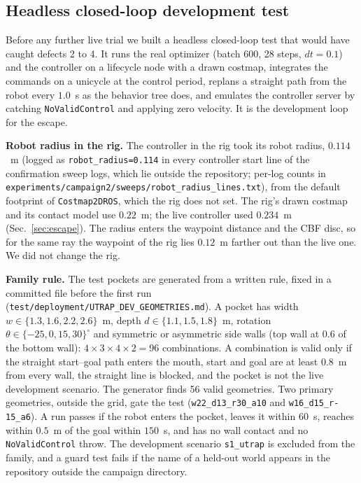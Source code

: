 \documentclass[journal]{IEEEtran}
\begin{document}
\subsection{Headless closed-loop development test}
\label{sec:devtest}

Before any further live trial we built a headless closed-loop test that would have
caught defects 2 to 4. It runs the real optimizer (batch 600, 28 steps, $dt=0.1$) and
the controller on a lifecycle node with a drawn costmap, integrates the commands on a
unicycle at the control period, replans a straight path from the robot every
$1.0$~s as the behavior tree does, and emulates the controller server by catching
\texttt{NoValidControl} and applying zero velocity. It is the development loop for the
escape.

\textbf{Robot radius in the rig.} The controller in the rig took its robot radius,
$0.114$~m (logged as \texttt{robot\_radius=0.114} in every controller start line of the
confirmation sweep logs, which lie outside the repository; per-log counts in \texttt{experiments/campaign2/sweeps/}\allowbreak\texttt{robot\_radius\_lines.txt}),
from the default footprint of \texttt{Costmap2DROS}, which the rig does not set. The rig's drawn
costmap and its contact model use $0.22$~m; the live controller used $0.234$~m
(Sec.~\ref{sec:escape}). The radius enters the waypoint distance and the
CBF disc, so for the same ray the waypoint of the rig lies $0.12$~m farther out than the live
one. We did not change the rig.

\textbf{Family rule.} The test pockets are generated from a written rule, fixed in a
committed file before the first run
(\texttt{test/deployment/UTRAP\_DEV\_GEOMETRIES.md}). A pocket has width $w\in\{1.3,
1.6, 2.2, 2.6\}$~m, depth $d\in\{1.1, 1.5, 1.8\}$~m, rotation $\theta\in\{-25, 0, 15,
30\}^\circ$ and symmetric or asymmetric side walls (top wall at $0.6$ of the
bottom wall): $4\times3\times4\times2=96$ combinations. A combination is valid only if the straight
start--goal path enters the mouth, start and goal are at least $0.8$~m from every wall,
the straight line is blocked, and the pocket is not the live development scenario. The generator
finds 56 valid geometries. Two primary geometries, outside the grid,
gate the test (\texttt{w22\_d13\_r30\_a10} and \texttt{w16\_d15\_r-15\_a6}). A run
passes if the robot enters the pocket, leaves it within $60$~s, reaches within $0.5$~m
of the goal within $150$~s, and has no wall contact and no \texttt{NoValidControl}
throw. The development scenario \texttt{s1\_utrap} is excluded from the family, and a
guard test fails if the name of a held-out world appears in the repository outside
the campaign directory.
\end{document}
